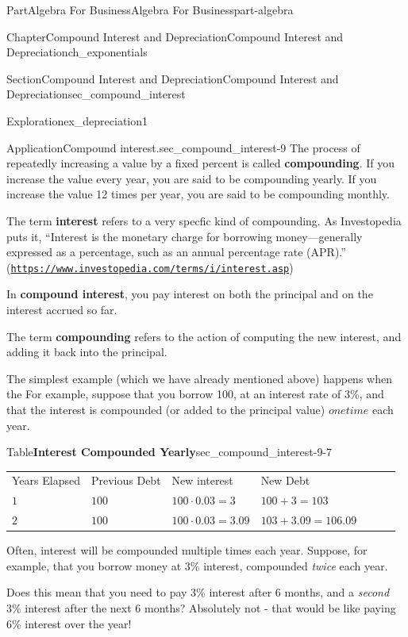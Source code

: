 \documentclass{tufte-book}
\newcommand{\tabularfont}{\relax}
\newcommand{\terminology}[1]{\textbf{#1}}
\numberwithin{equation}{chapter}
\newcommand{\hrulethin}  {\noalign{\hrule height 0.04em}}
\begin{document}
\begin{partptx}{Part}{Algebra For Business}{}{Algebra For Business}{}{}{part-algebra}
\begin{chapterptx}{Chapter}{Compound Interest and Depreciation}{}{Compound Interest and Depreciation}{}{}{ch_exponentials}
\begin{sectionptx}{Section}{Compound Interest and Depreciation}{}{Compound Interest and Depreciation}{}{}{sec_compound_interest}
\begin{exploration}{Exploration}{}{ex_depreciation1}
\begin{enumerate}[font=\bfseries,label=(\alph*),ref=\alph*]
\begin{image}{0.25}{0.5}{0.25}{}
{\begin{tikzpicture}
\end{tikzpicture}
}%
\end{image}%
\end{enumerate}%
\end{exploration}%
\begin{insight}{Application}{Compound interest.}{sec_compound_interest-9}%
The process of repeatedly increasing a value by a fixed percent is called \terminology{compounding}. If you increase the value every year, you are said to be compounding yearly. If you increase the value 12 times per year, you are said to be compounding monthly.%
\par
The term \terminology{interest} refers to a very specfic kind of compounding.  As Investopedia puts it, ``Interest is the monetary charge for borrowing money—generally expressed as a percentage, such as an annual percentage rate (APR).'' (\href{https://www.investopedia.com/terms/i/interest.asp}{\nolinkurl{https://www.investopedia.com/terms/i/interest.asp}})%
\par
In \terminology{compound interest}, you pay interest on both the principal and on the interest accrued so far.%
\par
The term \terminology{compounding} refers to the action of computing the new interest, and adding it back into the principal.%
\par
The simplest example (which we have already mentioned above) happens when the For example, suppose that you borrow \textdollar{}100, at an interest rate of 3\%, and that the interest is compounded (or added to the principal value) \(one time\) each year.%
\begin{tableptx}{Table}{\textbf{Interest Compounded Yearly}}{sec_compound_interest-9-7}{}%
\centering%
{\tabularfont%
\begin{tabular}{lAlAlAl}
Years Elapsed&Previous Debt&New interest&New Debt\tabularnewline\hrulethin
\(1\)&\(100\)&\(100\cdot 0.03=3\)&\(100+3=103\)\tabularnewline\hrulethin
\(2\)&\(100\)&\(100\cdot 0.03=3.09\)&\(103+3.09=106.09\)
\end{tabular}
}%
\end{tableptx}%
Often, interest will be compounded multiple times each year.  Suppose, for example, that you borrow money at 3\% interest, compounded \emph{twice} each year.%
\par
Does this mean that you need to pay 3\% interest after 6 months, and a \emph{second} 3\% interest after the next 6 months? Absolutely not - that would be like paying 6\% interest over the year!%
\par

\end{insight}
\end{sectionptx}
\end{chapterptx}
\end{partptx}
\end{document}
